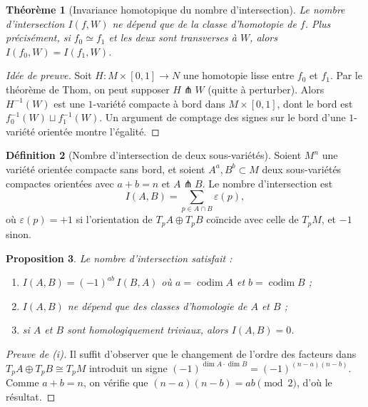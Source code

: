 \documentclass[12pt,a4paper,openany]{book}
\theoremstyle{definition}
\newtheorem{definition}{Définition}[chapter]
\theoremstyle{plain}
\newtheorem{theoreme}[definition]{Théorème}
\newtheorem{proposition}[definition]{Proposition}
\theoremstyle{remark}
\begin{document}
\begin{theoreme}[Invariance homotopique du nombre d'intersection]%
\label{thm:invariance-intersection}
Le nombre d'intersection $I(f, W)$ ne dépend que de la classe d'homotopie
de $f$. Plus précisément, si $f_0 \simeq f_1$ et les deux sont
transverses à $W$, alors $I(f_0, W) = I(f_1, W)$.
\end{theoreme}

\begin{proof}[Idée de preuve]
Soit $H \colon M \times [0,1] \to N$ une homotopie lisse entre $f_0$
et $f_1$. Par le théorème de Thom, on peut supposer $H \pitchfork W$
(quitte à perturber). Alors $H^{-1}(W)$ est une $1$-variété compacte à
bord dans $M \times [0,1]$, dont le bord est
$f_0^{-1}(W) \sqcup f_1^{-1}(W)$. Un argument de comptage des signes sur
le bord d'une $1$-variété orientée montre l'égalité.
\end{proof}

\begin{definition}[Nombre d'intersection de deux sous-variétés]%
\label{def:intersection-sous-varietes}
Soient $M^n$ une variété orientée compacte sans bord, et soient
$A^a, B^b \subset M$ deux sous-variétés compactes orientées avec
$a + b = n$ et $A \pitchfork B$. Le nombre d'intersection est
\[
  I(A, B) = \sum_{p \in A \cap B} \varepsilon(p),
\]
où $\varepsilon(p) = +1$ si l'orientation de
$T_p A \oplus T_p B$ coïncide avec celle de $T_p M$, et $-1$ sinon.
\end{definition}

\begin{proposition}\label{prop:proprietes-intersection}
Le nombre d'intersection satisfait :
\begin{enumerate}[label=\textup{(\roman*)}]
  \item $I(A, B) = (-1)^{ab}\, I(B, A)$ où $a = \operatorname{codim} A$
    et $b = \operatorname{codim} B$ ;
  \item $I(A, B)$ ne dépend que des classes d'homologie de $A$ et $B$ ;
  \item si $A$ et $B$ sont homologiquement triviaux, alors $I(A, B) = 0$.
\end{enumerate}
\end{proposition}

\begin{proof}[Preuve de (i)]
Il suffit d'observer que le changement de l'ordre des facteurs dans
$T_p A \oplus T_p B \cong T_p M$ introduit un signe
$(-1)^{\dim A \cdot \dim B} = (-1)^{(n-a)(n-b)}$. Comme
$a + b = n$, on vérifie que $(n-a)(n-b) = ab \pmod{2}$, d'où le résultat.
\end{proof}
\end{document}
